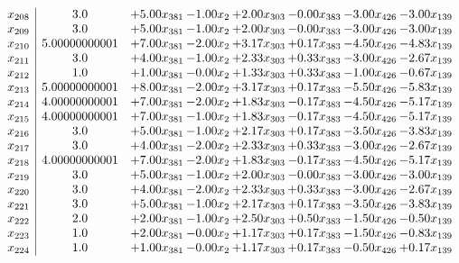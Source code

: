 \documentclass[8pt]{article}
\begin{document}
\[\begin{array}{c| c c@{\hskip 2pt} c@{\hskip 2pt} c@{\hskip 2pt} c@{\hskip 2pt} c@{\hskip 2pt} c@{\hskip 2pt} }
 x_{208}   &  3.0 & +  5.00 x_{381} & -1.00 x_{2} & +  2.00 x_{303} & -0.00 x_{383} & -3.00 x_{426} & -3.00 x_{139}\\
 x_{209}   &  3.0 & +  5.00 x_{381} & -1.00 x_{2} & +  2.00 x_{303} & -0.00 x_{383} & -3.00 x_{426} & -3.00 x_{139}\\
 x_{210}   &  5.00000000001 & +  7.00 x_{381} & -2.00 x_{2} & +  3.17 x_{303} & +  0.17 x_{383} & -4.50 x_{426} & -4.83 x_{139}\\
 x_{211}   &  3.0 & +  4.00 x_{381} & -1.00 x_{2} & +  2.33 x_{303} & +  0.33 x_{383} & -3.00 x_{426} & -2.67 x_{139}\\
 x_{212}   &  1.0 & +  1.00 x_{381} & -0.00 x_{2} & +  1.33 x_{303} & +  0.33 x_{383} & -1.00 x_{426} & -0.67 x_{139}\\
 x_{213}   &  5.00000000001 & +  8.00 x_{381} & -2.00 x_{2} & +  3.17 x_{303} & +  0.17 x_{383} & -5.50 x_{426} & -5.83 x_{139}\\
 x_{214}   &  4.00000000001 & +  7.00 x_{381} & -2.00 x_{2} & +  1.83 x_{303} & -0.17 x_{383} & -4.50 x_{426} & -5.17 x_{139}\\
 x_{215}   &  4.00000000001 & +  7.00 x_{381} & -1.00 x_{2} & +  1.83 x_{303} & -0.17 x_{383} & -4.50 x_{426} & -5.17 x_{139}\\
 x_{216}   &  3.0 & +  5.00 x_{381} & -1.00 x_{2} & +  2.17 x_{303} & +  0.17 x_{383} & -3.50 x_{426} & -3.83 x_{139}\\
 x_{217}   &  3.0 & +  4.00 x_{381} & -2.00 x_{2} & +  2.33 x_{303} & +  0.33 x_{383} & -3.00 x_{426} & -2.67 x_{139}\\
 x_{218}   &  4.00000000001 & +  7.00 x_{381} & -2.00 x_{2} & +  1.83 x_{303} & -0.17 x_{383} & -4.50 x_{426} & -5.17 x_{139}\\
 x_{219}   &  3.0 & +  5.00 x_{381} & -1.00 x_{2} & +  2.00 x_{303} & -0.00 x_{383} & -3.00 x_{426} & -3.00 x_{139}\\
 x_{220}   &  3.0 & +  4.00 x_{381} & -2.00 x_{2} & +  2.33 x_{303} & +  0.33 x_{383} & -3.00 x_{426} & -2.67 x_{139}\\
 x_{221}   &  3.0 & +  5.00 x_{381} & -1.00 x_{2} & +  2.17 x_{303} & +  0.17 x_{383} & -3.50 x_{426} & -3.83 x_{139}\\
 x_{222}   &  2.0 & +  2.00 x_{381} & -1.00 x_{2} & +  2.50 x_{303} & +  0.50 x_{383} & -1.50 x_{426} & -0.50 x_{139}\\
 x_{223}   &  1.0 & +  2.00 x_{381} & -0.00 x_{2} & +  1.17 x_{303} & +  0.17 x_{383} & -1.50 x_{426} & -0.83 x_{139}\\
 x_{224}   &  1.0 & +  1.00 x_{381} & -0.00 x_{2} & +  1.17 x_{303} & +  0.17 x_{383} & -0.50 x_{426} & +  0.17 x_{139}\\

\end{array}\]
\end{document}
